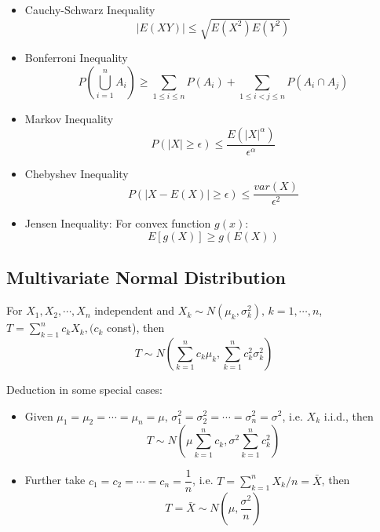 \begin{itemize}
    \item Cauchy-Schwarz Inequality
    \begin{equation}
        |E(XY)|\leq\sqrt{E(X^2)E(Y^2)}
    \end{equation}

    \item Bonferroni Inequality
\begin{equation}    P(\bigcup_{i=1}^n A_i)\geq \sum_{1\leq i\leq n} P(A_i)+\sum_{1\leq i <j\leq n} P(A_i\cap A_j)
\end{equation}
    \item Markov Inequality
\begin{equation}    P(|X|\geq \epsilon)\leq\frac{E(|X|^\alpha)}{\epsilon^\alpha}
\end{equation}

    \item Chebyshev Inequality
\begin{equation}    P(|X-E(X)|\geq\epsilon)\leq\frac{var(X)}{\epsilon^2}
\end{equation}
    \item Jensen Inequality: For convex function $g(x)$:
\begin{equation}    E[g(X)]\geq g(E(X))
\end{equation}

\end{itemize}


\subsection{Multivariate Normal Distribution}\label{SubsectionDerivationMultivariateNormal}
    For $X_1,X_2,\cdots,X_n$ independent and $X_k\sim N(\mu_k,\sigma^2_k),\, k=1,\cdots,n$, $T={\displaystyle\sum_{k=1}^n c_kX_k}, (c_k$ const), then
    \begin{equation}
        T\sim N(\sum_{k=1}^nc_k\mu_k,\sum_{k=1}^n c_k^2\sigma^2_k)    
    \end{equation}

    Deduction in some special cases:
    \begin{itemize}
        \item Given $\mu_1=\mu_2=\cdots=\mu_n=\mu,\, \sigma^2_1=\sigma^2_2=\cdots=\sigma^2_n=\sigma^2$, i.e. $X_k$ i.i.d., then
        \begin{equation}\label{EqaDistributionOfSumOfiidNormal}
            T\sim   N(\mu\sum_{k=1}^n c_k,\sigma^2\sum_{k=1}^n c_k^2) 
        \end{equation}
        \item Further take $c_1=c_2=\cdots=c_n=\dfrac{1}{n}$, i.e. $T={\displaystyle \sum_{k=1}^n X_k /n}=\bar{X}$, then
        \begin{equation}    
            T=\bar{X}\sim N(\mu,\frac{\sigma^2}{n})    
        \end{equation}
    \end{itemize}





